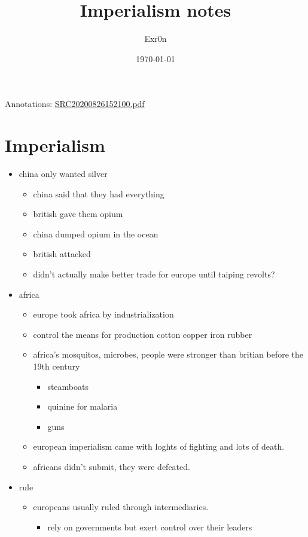 \documentclass[letterpaper]{article}
\author{Exr0n}
\date{\today}
\title{Imperialism notes}
\renewcommand{\tableofcontents}{}
\begin{document}
\tableofcontents

Annotations: \href{SRC20200826152100.pdf.org}{SRC20200826152100.pdf}

\section{Imperialism}
\label{sec:org349ff18}
\begin{itemize}
\item china only wanted silver

\begin{itemize}
\item china said that they had everything
\item british gave them opium
\item china dumped opium in the ocean
\item british attacked
\item didn't actually make better trade for europe until taiping revolts?
\end{itemize}

\item africa

\begin{itemize}
\item europe took africa by industrialization
\item control the means for production cotton copper iron rubber
\item africa's mosquitos, microbes, people were stronger than britian
before the 19th century

\begin{itemize}
\item steamboats
\item quinine for malaria
\item guns
\end{itemize}

\item european imperialism came with loghts of fighting and lots of death.
\item africans didn't submit, they were defeated.
\end{itemize}

\item rule

\begin{itemize}
\item europeans usually ruled through intermediaries.

\begin{itemize}
\item rely on governments but exert control over their leaders
\end{itemize}


\end{itemize}
\end{itemize}
\end{document}
